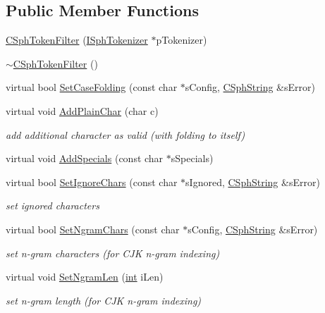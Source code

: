 \subsection*{Public Member Functions}
\begin{DoxyCompactItemize}
\item 
\hyperlink{classCSphTokenFilter_a1a1889ac7db649c4ff5fc7c59dd905df}{C\-Sph\-Token\-Filter} (\hyperlink{classISphTokenizer}{I\-Sph\-Tokenizer} $\ast$p\-Tokenizer)
\item 
\hyperlink{classCSphTokenFilter_a353fc0d4ab09dd940b62ae3a7e8c4e2e}{$\sim$\-C\-Sph\-Token\-Filter} ()
\item 
virtual bool \hyperlink{classCSphTokenFilter_a54970214ad18160d2bb6ae1e9a8c2353}{Set\-Case\-Folding} (const char $\ast$s\-Config, \hyperlink{structCSphString}{C\-Sph\-String} \&s\-Error)
\item 
virtual void \hyperlink{classCSphTokenFilter_abc3185829bdf6cfe455d1d418792dd57}{Add\-Plain\-Char} (char c)
\begin{DoxyCompactList}\small\item\em add additional character as valid (with folding to itself) \end{DoxyCompactList}\item 
virtual void \hyperlink{classCSphTokenFilter_a0946b8aa4128ad202dca45a3fe8c2a4c}{Add\-Specials} (const char $\ast$s\-Specials)
\item 
virtual bool \hyperlink{classCSphTokenFilter_afbccf1d71c91739356dede1bbb6a86c7}{Set\-Ignore\-Chars} (const char $\ast$s\-Ignored, \hyperlink{structCSphString}{C\-Sph\-String} \&s\-Error)
\begin{DoxyCompactList}\small\item\em set ignored characters \end{DoxyCompactList}\item 
virtual bool \hyperlink{classCSphTokenFilter_a85dcf8ee4a7ddb5f9b71f18b27823224}{Set\-Ngram\-Chars} (const char $\ast$s\-Config, \hyperlink{structCSphString}{C\-Sph\-String} \&s\-Error)
\begin{DoxyCompactList}\small\item\em set n-\/gram characters (for C\-J\-K n-\/gram indexing) \end{DoxyCompactList}\item 
virtual void \hyperlink{classCSphTokenFilter_a53adf3906caccfcc59d7d606d00c6f38}{Set\-Ngram\-Len} (\hyperlink{sphinxexpr_8cpp_a4a26e8f9cb8b736e0c4cbf4d16de985e}{int} i\-Len)
\begin{DoxyCompactList}\small\item\em set n-\/gram length (for C\-J\-K n-\/gram indexing) \end{DoxyCompactList}\item 

\end{DoxyCompactItemize}
